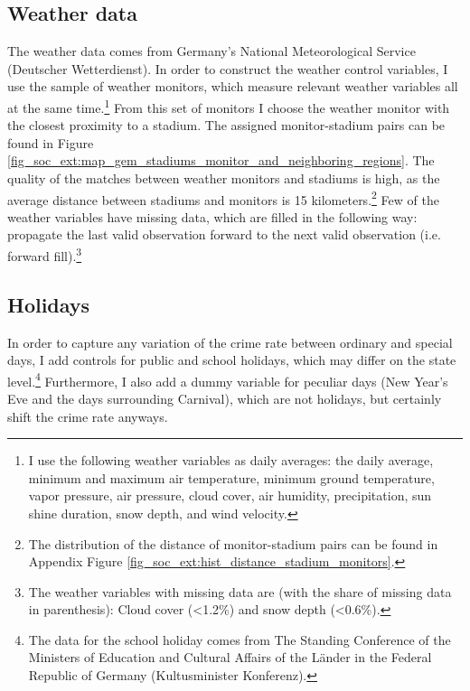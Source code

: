 \documentclass[11pt, a4paper]{article} %
\begin{document}
\subsection{Weather data}
The weather data comes from Germany's National Meteorological Service (Deutscher Wetterdienst). In order to construct the weather control variables, I use the sample of weather monitors, which measure relevant weather variables all at the same time.\footnote{I use the following weather variables as daily averages: the daily average, minimum and maximum air temperature, minimum ground temperature, vapor pressure, air pressure, cloud cover, air humidity, precipitation, sun shine duration, snow depth, and wind velocity.} From this set of monitors I choose the weather monitor with the closest proximity to a stadium. The assigned monitor-stadium pairs can be found in Figure \ref{fig_soc_ext:map_gem_stadiums_monitor_and_neighboring_regions}. The quality of the matches between weather monitors and stadiums is high, as the average distance between stadiums and monitors is 15 kilometers.\footnote{The distribution of the distance of monitor-stadium pairs can be found in Appendix Figure \ref{fig_soc_ext:hist_distance_stadium_monitors}.} Few of the weather variables have missing data, which are filled in the following way: propagate the last valid observation forward to the next valid observation (i.e. forward fill).\footnote{The weather variables with missing data are (with the share of missing data in parenthesis): Cloud cover (<1.2\%) and snow depth (<0.6\%).}



\subsection{Holidays}
In order to capture any variation of the crime rate between ordinary and special days, I add controls for public and school holidays, which may differ on the state level.\footnote{The data for the school holiday comes from The Standing Conference of the Ministers of Education and Cultural Affairs of the Länder in the Federal Republic of Germany (Kultusminister Konferenz).} Furthermore, I also add a dummy variable for peculiar days (New Year's Eve and the days surrounding Carnival), which are not holidays, but certainly shift the crime rate anyways.
\end{document}
